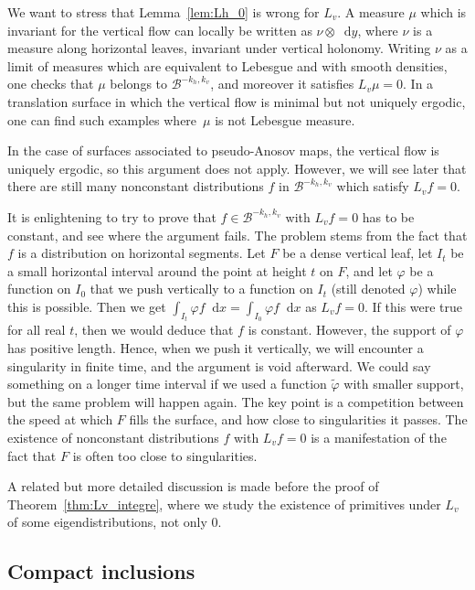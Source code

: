 \documentclass[JEP,XML,SOM,Unicode]{cedram}
\newcommand{\boB}{\mathcal{B}}
\newcommand{\dd}{\mathop{}\!\mathrm{d}}
\let\phi\varphi
\theoremstyle{definition}
\numberwithin{equation}{section}
\begin{document}
We want to stress that Lemma~\ref{lem:Lh_0} is wrong for $L_v$. A measure
$\mu$ which is invariant for the vertical flow can locally be written as
$\nu\otimes \dd y$, where $\nu$ is a measure along horizontal leaves,
invariant under vertical holonomy. Writing $\nu$ as a limit of measures which
are equivalent to Lebesgue and with smooth densities, one checks that $\mu$
belongs to $\boB^{-k_h, k_v}$, and moreover it satisfies $L_v \mu=0$. In a
translation surface in which the vertical flow is minimal but not uniquely
ergodic, one can find such examples where~$\mu$ is not Lebesgue measure.

In the case of surfaces associated to pseudo-Anosov maps, the vertical flow
is uniquely ergodic, so this argument does not apply. However, we will
see later that there are still many nonconstant distributions $f$ in
$\boB^{-k_h, k_v}$ which satisfy $L_v f = 0$.

It is enlightening to try to prove that $f\in \boB^{-k_h, k_v}$ with $L_v f =
0$ has to be constant, and see where the argument fails. The problem stems
from the fact that $f$ is a distribution on horizontal segments. Let $F$ be a
dense vertical leaf, let $I_t$ be a small horizontal interval around the
point at height $t$ on $F$, and let $\phi$ be a function on $I_0$ that we
push vertically to a function on $I_t$ (still denoted $\phi$) while this is
possible. Then we get $\int_{I_t} \phi f \dd x = \int_{I_0} \phi f \dd x$ as
$L_v f= 0$. If this were true for all real $t$, then we would deduce that $f$
is constant. However, the support of $\phi$ has positive length. Hence, when
we push it vertically, we will encounter a singularity in finite time, and
the argument is void afterward. We could say something on a longer time
interval if we used a function $\tilde\phi$ with smaller support, but the
same problem will happen again. The key point is a competition between the
speed at which $F$ fills the surface, and how close to singularities it
passes. The existence of nonconstant distributions $f$ with $L_v f = 0$ is a
manifestation of the fact that $F$ is often too close to singularities.

A related but more detailed discussion is made before the proof of
Theorem~\ref{thm:Lv_integre}, where we study the existence of primitives
under $L_v$ of some eigendistributions, not only $0$.

\subsection{Compact inclusions}
\end{document}
